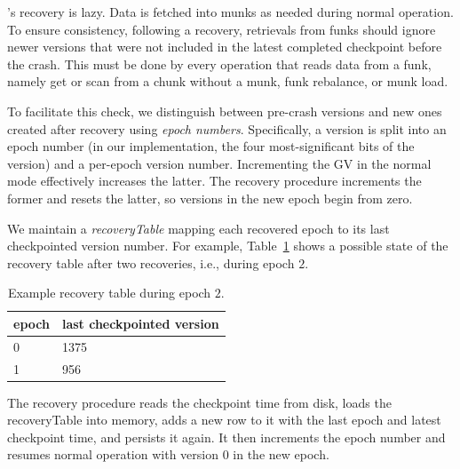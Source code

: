 \sys's recovery is lazy. 
Data is fetched into munks as needed during normal operation. 
To ensure consistency, following a recovery,  
retrievals from funks should ignore newer versions that were not included in the latest completed checkpoint before the crash. 
This must be done by every operation that reads data from a funk, namely get or scan from a chunk without a munk, 
funk rebalance, or munk load. 

To facilitate this check, we distinguish between pre-crash versions and new ones created after recovery using \emph{epoch numbers}. 
Specifically, a version is split into an epoch number (in our implementation, the four most-significant bits of the version) and a per-epoch version number. 
Incrementing the GV in the normal mode effectively increases the latter.
The recovery procedure increments the former and resets the latter, so 
versions in the new epoch begin from zero. 

We maintain a \emph{recoveryTable} mapping each recovered epoch to its last checkpointed version number. 
For example, Table~\ref{table:recovery} shows a possible state of the recovery table after two recoveries, i.e., during epoch $2$. 

\begin{table}
\begin{center}
\begin{tabular}{ll}
epoch & last checkpointed version \\
\hline
0 & 1375\\
1 &  956\\
\end{tabular}
\end{center}
\caption{Example recovery table during epoch $2$.}
\label{table:recovery}
\end{table} 
 
The recovery procedure reads the checkpoint time from disk, loads the recoveryTable into memory, adds a new row to it with the last epoch and latest checkpoint time, and persists it again. It then increments the epoch number and resumes normal operation with version  $0$ in the new epoch.







